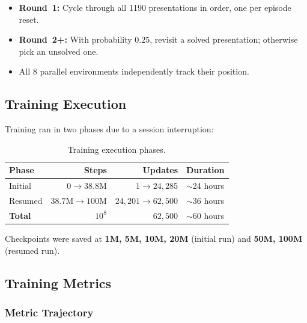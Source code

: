 \documentclass[11pt,a4paper]{article}
\begin{document}
\begin{itemize}[nosep]
  \item \textbf{Round~1:} Cycle through all 1190 presentations in order, one per
    episode reset.
  \item \textbf{Round~2+:} With probability $0.25$, revisit a solved
    presentation; otherwise pick an unsolved one.
  \item All 8 parallel environments independently track their position.
\end{itemize}

\subsection{Training Execution}\label{sec:training-exec}

Training ran in two phases due to a session interruption:

\begin{table}[h]
\centering
\caption{Training execution phases.}
\label{tab:training-phases}
\begin{tabular}{lrrl}
  \toprule
  \textbf{Phase} & \textbf{Steps} & \textbf{Updates} & \textbf{Duration} \\
  \midrule
  Initial  & $0 \to 38.8\text{M}$   & $1 \to 24{,}285$       & $\sim$24 hours \\
  Resumed  & $38.7\text{M} \to 100\text{M}$ & $24{,}201 \to 62{,}500$ & $\sim$36 hours \\
  \midrule
  \textbf{Total} & $10^8$ & $62{,}500$ & $\sim$60 hours \\
  \bottomrule
\end{tabular}
\end{table}

Checkpoints were saved at \textbf{1M, 5M, 10M, 20M} (initial run) and
\textbf{50M, 100M} (resumed run).

\subsection{Training Metrics}\label{sec:metrics}

\subsubsection{Metric Trajectory}
\end{document}
